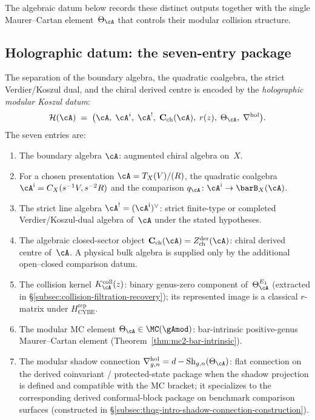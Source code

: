 The algebraic datum below records these distinct outputs together with
the single Maurer--Cartan element~$\Theta_\cA$ that controls their
modular collision structure.

\subsection{Holographic datum: the seven-entry package}
\label{subsec:holographic-datum-seven-entry}
\label{subsec:holographic-datum-sixfold}

The separation of the boundary algebra, the quadratic coalgebra,
the strict Verdier/Koszul dual, and the chiral derived centre is
encoded by the \emph{holographic modular Koszul datum}:
\begin{equation}\label{eq:supp-holographic-datum-intro}
\mathcal{H}(\cA)
\;=\;
\bigl(\cA,\;\cA^i,\;\cA^!,\;\mathbf{C}_{\mathrm{ch}}(\cA),\;
r(z),\;\Theta_\cA,\;\nabla^{\mathrm{hol}}\bigr).
\end{equation}
The seven entries are:
\begin{enumerate}[label=\textup{(\roman*)}]
\item The boundary algebra $\cA$: augmented chiral algebra on~$X$.
\item For a chosen presentation $\cA=T_X(V)/(R)$, the quadratic
 coalgebra $\cA^{\mathrm i}=C_X(s^{-1}V,s^{-2}R)$ and the comparison
 $q_\cA\colon\cA^{\mathrm i}\to\barB_X(\cA)$.
\item The strict line algebra $\cA^!=(\cA^{\mathrm i})^\vee$: strict
 finite-type or completed Verdier/Koszul-dual algebra of~$\cA$ under
 the stated hypotheses.
\item The algebraic closed-sector object
 $\mathbf{C}_{\mathrm{ch}}(\cA)=Z^{\mathrm{der}}_{\mathrm{ch}}(\cA)$:
 chiral derived centre of~$\cA$. A physical bulk algebra is supplied
 only by the additional open--closed comparison datum.
\item The collision kernel $K_\cA^{\mathrm{coll}}(z)$: binary
 genus-zero component of~$\Theta_\cA^{E_1}$ (extracted in
 \S\ref{subsec:collision-filtration-recovery}); its represented image
 is a classical $r$-matrix under $H_{\mathrm{CYBE}}^{\mathrm{rep}}$.
\item The modular MC element
 $\Theta_\cA \in \MC(\gAmod)$: bar-intrinsic positive-genus
 Maurer--Cartan element
 (Theorem~\ref{thm:mc2-bar-intrinsic}).
\item The modular shadow connection
 $\nabla^{\mathrm{hol}}_{g,n} = d - \operatorname{Sh}_{g,n}(\Theta_\cA)$:
 flat connection on the derived coinvariant / protected-state package
 when the shadow projection is defined and compatible with the MC
 bracket; it specializes to the corresponding derived conformal-block
 package on benchmark comparison surfaces
 (constructed in \S\ref{subsec:thqg-intro-shadow-connection-construction}).
\end{enumerate}
